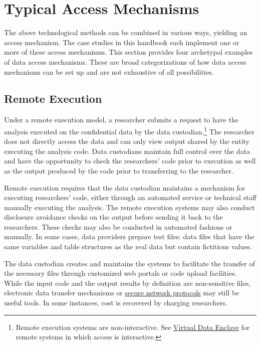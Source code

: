 \hypertarget{typical-access-mechanisms}{%
\section{Typical Access Mechanisms}\label{typical-access-mechanisms}}

The above technological methods can be combined in various ways, yielding an access mechanism. The case studies in this handbook each implement one or more of these access mechanisms. This section provides four archetypal examples of data access mechanisms. These are broad categorizations of how data access mechanisms can be set up and are not exhaustive of all possibilities.

\hypertarget{remote-execution}{%
\subsection{Remote Execution}\label{remote-execution}}

Under a remote execution model, a researcher submits a request to have the analysis executed on the confidential data by the data custodian.\footnote{Remote execution systems are non-interactive. See \protect\hyperlink{virtual-data-enclave}{Virtual Data Enclave} for remote systems in which access is interactive.} The researcher does not directly access the data and can only view output shared by the entity executing the analysis code. Data custodians maintain full control over the data and have the opportunity to check the researchers' code prior to execution as well as the output produced by the code prior to transferring to the researcher.

Remote execution requires that the data custodian maintains a mechanism for executing researchers' code, either through an automated service or technical staff manually executing the analysis. The remote execution systems may also conduct disclosure avoidance checks on the output before sending it back to the researchers. These checks may also be conducted in automated fashions or manually. In some cases, data providers prepare test files: data files that have the same variables and table structures as the real data but contain fictitious values.

The data custodian creates and maintains the systems to facilitate the transfer of the necessary files through customized web portals or code upload facilities. While the input code and the output results by definition are non-sensitive files, electronic data transfer mechanisms or \protect\hyperlink{secure-network-protocols}{secure network protocols} may still be useful tools. In some instances, cost is recovered by charging researchers.

